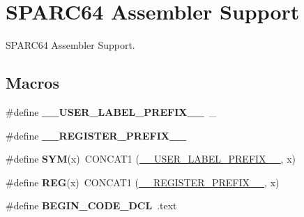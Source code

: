 \hypertarget{group__RTEMSScoreCPUSPARC64ASM}{}\section{S\+P\+A\+R\+C64 Assembler Support}
\label{group__RTEMSScoreCPUSPARC64ASM}


S\+P\+A\+R\+C64 Assembler Support.  


\subsection*{Macros}
\begin{DoxyCompactItemize}
\item 
\mbox{\label{group__RTEMSScoreCPUSPARC64ASM_gaff6bf0ff0fa3b5cbd23a8ae1131c87a9}} 
\#define {\bfseries \+\_\+\+\_\+\+U\+S\+E\+R\+\_\+\+L\+A\+B\+E\+L\+\_\+\+P\+R\+E\+F\+I\+X\+\_\+\+\_\+}~\+\_\+
\item 
\mbox{\label{group__RTEMSScoreCPUSPARC64ASM_ga08d4062230ffc8494f4be4f6447497e4}} 
\#define {\bfseries \+\_\+\+\_\+\+R\+E\+G\+I\+S\+T\+E\+R\+\_\+\+P\+R\+E\+F\+I\+X\+\_\+\+\_\+}
\item 
\mbox{\label{group__RTEMSScoreCPUSPARC64ASM_gafe05d428a5f345f51fb591debb815325}} 
\#define {\bfseries S\+YM}(x)~C\+O\+N\+C\+A\+T1 (\mbox{\hyperlink{group__RTEMSScoreCPUx86-64ASM_gaff6bf0ff0fa3b5cbd23a8ae1131c87a9}{\+\_\+\+\_\+\+U\+S\+E\+R\+\_\+\+L\+A\+B\+E\+L\+\_\+\+P\+R\+E\+F\+I\+X\+\_\+\+\_\+}}, x)
\item 
\mbox{\label{group__RTEMSScoreCPUSPARC64ASM_gacee196421e9a06f7700bb3064b13b37a}} 
\#define {\bfseries R\+EG}(x)~C\+O\+N\+C\+A\+T1 (\mbox{\hyperlink{group__RTEMSScoreCPUV850ASM_ga08d4062230ffc8494f4be4f6447497e4}{\+\_\+\+\_\+\+R\+E\+G\+I\+S\+T\+E\+R\+\_\+\+P\+R\+E\+F\+I\+X\+\_\+\+\_\+}}, x)
\item 
\mbox{\label{group__RTEMSScoreCPUSPARC64ASM_ga63dd305e6cb437ad2dc29a4184f96fbc}} 
\#define {\bfseries B\+E\+G\+I\+N\+\_\+\+C\+O\+D\+E\+\_\+\+D\+CL}~.text
\item 
\mbox{\label{group__RTEMSScoreCPUSPARC64ASM_gad7bee6a7cae4ed99b9f83f54afaecec8}} 

\end{DoxyCompactItemize}
